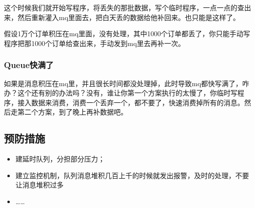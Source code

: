 \documentclass[12pt]{article}
\begin{document}
这个时候我们就开始写程序，将丢失的那批数据，写个临时程序，一点一点的查出来，然后重新灌入mq里面去，把白天丢的数据给他补回来。也只能是这样了。

假设1万个订单积压在mq里面，没有处理，其中1000个订单都丢了，你只能手动写程序把那1000个订单给查出来，手动发到mq里去再补一次。

\subsubsection{Queue快满了}
如果是消息积压在mq里，并且很长时间都没处理掉，此时导致mq都快写满了，咋办？这个还有别的办法吗？没有，谁让你第一个方案执行的太慢了，你临时写程序，接入数据来消费，消费一个丢弃一个，都不要了，快速消费掉所有的消息。然后走第二个方案，到了晚上再补数据吧。

\subsection{预防措施}
\begin{itemize}
\setlength{\itemsep}{0pt}
\setlength{\parsep}{0pt}
\setlength{\parskip}{0pt}
    \item 建延时队列，分担部分压力；
    \item 建立监控机制，队列消息堆积几百上千的时候就发出报警，及时的处理，不要让消息堆积过多
    \item ……
\end{itemize}




\end{document}
